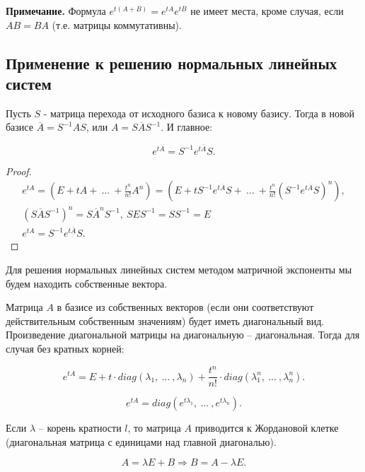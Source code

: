 \textbf{Примечание.} Формула $e^{t(A+B)} = e^{tA}e^{tB}$ не имеет места, кроме случая, если $AB = BA$ (т.е. матрицы коммутативны).

\subsection{Применение к решению нормальных линейных систем}

\begin{theorem}

Пусть $S$ - матрица перехода от исходного базиса к новому базису. Тогда в новой базисе $\overline{A} = S^{-1}AS$, или $A = S\overline{A}S^{-1}$. И главное:

\[e^{tA} = S^{-1}e^{t\overline{A}}S.\]

\end{theorem}

\begin{proof}
	\begin{equation*}
		\begin{gathered}
 e^{tA} = \left(E + tA +\ \dots\ + \frac{t^{n}}{n!}A^{n}\right) = \left(E + tS^{-1}e^{t\overline{A}}S +\ \dots\ + \frac{t^{n}}{n!}(S^{-1}e^{t\overline{A}}S)^{n}\right), \\
 (S\overline{A}S^{-1})^n = S\overline{A}^nS^{-1},\ SES^{-1} = SS^{-1} = E \\
 e^{tA} = S^{-1}e^{t\overline{A}}S.
		\end{gathered}
	\end{equation*}
\end{proof}

Для решения нормальных линейных систем методом матричной экспоненты мы будем находить собственные вектора.

Матрица $A$ в базисе из собственных векторов (если они соответствуют действительным собственным значениям) будет иметь диагональный вид. Произведение диагональной матрицы на диагональную -- диагональная. Тогда для случая без кратных корней:

\[ e^{tA} = E + t\cdot diag(\lambda_1,\ ...\ ,\lambda_n) + \frac{t^n}{n!}\cdot diag(\lambda_1^n,\ ...\ ,\lambda_n^n).\]

\[ e^{tA} = diag(e^{t\lambda_1},\ ...\ , e^{t\lambda_n}).\]

Если $\lambda$ -- корень кратности $l$, то матрица $A$ приводится к Жордановой клетке (диагональная матрица с единицами над главной диагональю).

\[ A = \lambda E + B \Rightarrow B = A - \lambda E. \]

